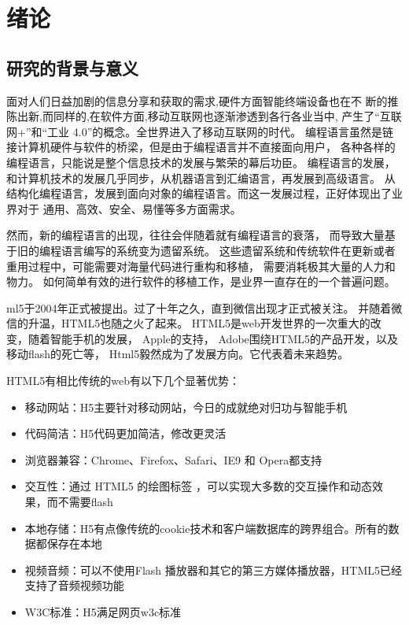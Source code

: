 \chapter{绪论}

\section{研究的背景与意义}

面对人们日益加剧的信息分享和获取的需求,硬件方面智能终端设备也在不
断的推陈出新,而同样的,在软件方面,移动互联网也逐渐渗透到各行各业当中, 
产生了“互联网+”和“工业 4.0”的概念。全世界进入了移动互联网的时代。
编程语言虽然是链接计算机硬件与软件的桥梁，但是由于编程语言并不直接面向用户，
各种各样的编程语言，只能说是整个信息技术的发展与繁荣的幕后功臣。
编程语言的发展，和计算机技术的发展几乎同步，从机器语言到汇编语言，再发展到高级语言。
从结构化编程语言，发展到面向对象的编程语言。而这一发展过程，正好体现出了业界对于
通用、高效、安全、易懂等多方面需求。

然而，新的编程语言的出现，往往会伴随着就有编程语言的衰落，
而导致大量基于旧的编程语言编写的系统变为遗留系统。
这些遗留系统和传统软件在更新或者重用过程中，可能需要对海量代码进行重构和移植，
需要消耗极其大量的人力和物力。
如何简单有效的进行软件的移植工作，是业界一直存在的一个普遍问题。

ml5于2004年正式被提出。过了十年之久，直到微信出现才正式被关注。
并随着微信的升温，HTML5也随之火了起来。
HTML5是web开发世界的一次重大的改变，随着智能手机的发展， 
Apple的支持， Adobe围绕HTML5的产品开发，以及移动flash的死亡等，
Html5毅然成为了发展方向。它代表着未来趋势。

HTML5有相比传统的web有以下几个显著优势：

\begin{itemize}
    \item {\heiti 移动网站：}H5主要针对移动网站，今日的成就绝对归功与智能手机
    \item {\heiti 代码简洁：}H5代码更加简洁，修改更灵活
    \item {\heiti 浏览器兼容：}Chrome、Firefox、Safari、IE9 和 Opera都支持 
    \item {\heiti 交互性：}通过 HTML5 的绘图标签 ，可以实现大多数的交互操作和动态效果，而不需要flash
    \item {\heiti 本地存储：}H5有点像传统的cookie技术和客户端数据库的跨界组合。所有的数据都保存在本地
    \item {\heiti 视频音频：}可以不使用Flash 播放器和其它的第三方媒体播放器，HTML5已经支持了音频视频功能
    \item {\heiti W3C标准：}H5满足网页w3c标准
\end{itemize}


